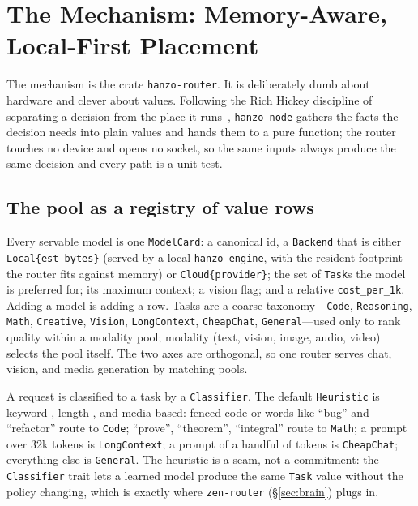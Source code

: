 \documentclass[11pt]{article}
\begin{document}
\section{The Mechanism: Memory-Aware, Local-First Placement}
\label{sec:mechanism}

The mechanism is the crate \texttt{hanzo-router}. It is deliberately dumb about
hardware and clever about values. Following the Rich Hickey discipline of
separating a decision from the place it runs~\cite{hickey_simple},
\texttt{hanzo-node} gathers the facts the decision needs into plain values and
hands them to a pure function; the router touches no device and opens no socket,
so the same inputs always produce the same decision and every path is a unit
test.



\subsection{The pool as a registry of value rows}

Every servable model is one \texttt{ModelCard}: a canonical id, a
\texttt{Backend} that is either \texttt{Local\{est\_bytes\}} (served by a local
\texttt{hanzo-engine}, with the resident footprint the router fits against
memory) or \texttt{Cloud\{provider\}}; the set of \texttt{Task}s the model is
preferred for; its maximum context; a vision flag; and a relative
\texttt{cost\_per\_1k}. Adding a model is adding a row. Tasks are a coarse
taxonomy---\texttt{Code}, \texttt{Reasoning}, \texttt{Math}, \texttt{Creative},
\texttt{Vision}, \texttt{LongContext}, \texttt{CheapChat}, \texttt{General}---used
only to rank quality within a modality pool; modality (text, vision, image,
audio, video) selects the pool itself. The two axes are orthogonal, so one
router serves chat, vision, and media generation by matching pools.

A request is classified to a task by a \texttt{Classifier}. The default
\texttt{Heuristic} is keyword-, length-, and media-based: fenced code or words
like ``bug'' and ``refactor'' route to \texttt{Code}; ``prove'', ``theorem'',
``integral'' route to \texttt{Math}; a prompt over 32k tokens is
\texttt{LongContext}; a prompt of a handful of tokens is \texttt{CheapChat};
everything else is \texttt{General}. The heuristic is a seam, not a commitment:
the \texttt{Classifier} trait lets a learned model produce the same
\texttt{Task} value without the policy changing, which is exactly where
\texttt{zen-router} (\S\ref{sec:brain}) plugs in.
\end{document}
